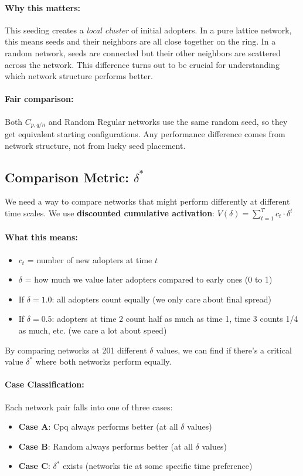 \documentclass[12pt,a4paper]{article}
\begin{document}
\paragraph{Why this matters:}
This seeding creates a \textit{local cluster} of initial adopters. In a pure lattice network, this means seeds and their neighbors are all close together on the ring. In a random network, seeds are connected but their other neighbors are scattered across the network. This difference turns out to be crucial for understanding which network structure performs better.

\paragraph{Fair comparison:}
Both $C_{p,q/n}$ and Random Regular networks use the same random seed, so they get equivalent starting configurations. Any performance difference comes from network structure, not from lucky seed placement.

\subsection{Comparison Metric: \texorpdfstring{$\delta^*$}{delta*}}

We need a way to compare networks that might perform differently at different time scales. We use \textbf{discounted cumulative activation}: $V(\delta) = \sum_{t=1}^{T} c_t \cdot \delta^t$

\paragraph{What this means:}
\begin{itemize}
    \item $c_t$ = number of new adopters at time $t$
    \item $\delta$ = how much we value later adopters compared to early ones (0 to 1)
    \item If $\delta = 1.0$: all adopters count equally (we only care about final spread)
    \item If $\delta = 0.5$: adopters at time 2 count half as much as time 1, time 3 counts 1/4 as much, etc. (we care a lot about speed)
\end{itemize}

By comparing networks at 201 different $\delta$ values, we can find if there's a critical value $\delta^*$ where both networks perform equally.

\paragraph{Case Classification:}
Each network pair falls into one of three cases:
\begin{itemize}
    \item \textbf{Case A}: Cpq always performs better (at all $\delta$ values)
    \item \textbf{Case B}: Random always performs better (at all $\delta$ values)
    \item \textbf{Case C}: $\delta^*$ exists (networks tie at some specific time preference)
\end{itemize}
\end{document}
